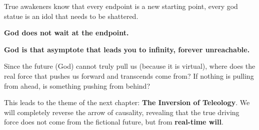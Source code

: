 True awakeners know that every endpoint is a new starting point, every god statue is an idol that needs to be shattered.

\textbf{God does not wait at the endpoint.}

\textbf{God is that asymptote that leads you to infinity, forever unreachable.}

Since the future (God) cannot truly pull us (because it is virtual), where does the real force that pushes us forward and transcends come from? If nothing is pulling from ahead, is something pushing from behind?

This leads to the theme of the next chapter: \textbf{The Inversion of Teleology}. We will completely reverse the arrow of causality, revealing that the true driving force does not come from the fictional future, but from \textbf{real-time will}.

